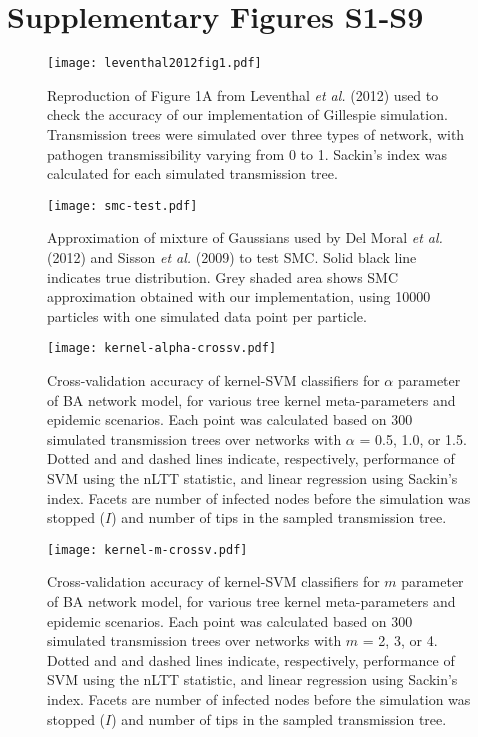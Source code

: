 \documentclass[12pt]{article}
\begin{document}
\section*{Supplementary Figures S1-S9}

\renewcommand{\thefigure}{S\arabic{figure}}

\begin{figure}[ht]
  \centering
  \texttt{[image: leventhal2012fig1.pdf]}
  \caption{
    Reproduction of Figure 1A from Leventhal \textit{et al.} (2012) used to
    check the accuracy of our implementation of Gillespie simulation.
    Transmission trees were simulated over three types of network, with
    pathogen transmissibility varying from 0 to 1. Sackin's index was
    calculated for each simulated transmission tree.
  }
  \label{fig:sf1}
\end{figure}

\begin{figure}[ht]
  \centering
  \texttt{[image: smc-test.pdf]}
  \caption{Approximation of mixture of Gaussians used by
    Del Moral \textit{et al.} (2012) and Sisson \textit{et al.} (2009) to test
    SMC. Solid black line indicates true distribution. Grey shaded area shows
    SMC approximation obtained with our implementation, using 10000
    particles with one simulated data point per particle.
  }
  \label{fig:smctest}
\end{figure}

\begin{figure}[ht]
  \centering
  \texttt{[image: kernel-alpha-crossv.pdf]}
  \caption{
    Cross-validation accuracy of kernel-SVM classifiers for $\alpha$ parameter
    of BA network model, for various tree kernel meta-parameters and
    epidemic scenarios. Each point was calculated based on 300 simulated
    transmission trees over networks with $\alpha$ = 0.5, 1.0, or 1.5. Dotted
    and and dashed lines indicate, respectively, performance of SVM using the
    nLTT statistic, and linear regression using Sackin's index. Facets
    are number of infected nodes before the simulation was stopped ($I$) and
    number of tips in the sampled transmission tree.
  }
  \label{fig:alphacrossv}
\end{figure}

\begin{figure}[ht]
  \centering
  \texttt{[image: kernel-m-crossv.pdf]}
  \caption{Cross-validation accuracy of kernel-SVM classifiers for $m$
      parameter of BA network model, for various tree kernel
      meta-parameters and epidemic scenarios. Each point was calculated based
      on 300 simulated transmission trees over networks with $m$ = 2, 3, or 4.
      Dotted and and dashed lines indicate, respectively, performance of SVM
      using the nLTT statistic, and linear regression using Sackin's
      index. Facets are number of infected nodes before the simulation was
      stopped ($I$) and number of tips in the sampled transmission tree.
  }
  \label{fig:mcrossv}
\end{figure}
\end{document}
